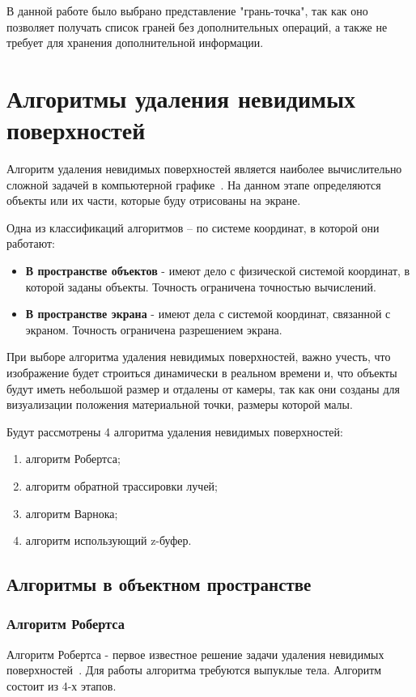 В данной работе было выбрано представление "грань-точка", так как оно позволяет получать список граней без дополнительных операций, а также не требует для хранения дополнительной информации.

\section{Алгоритмы удаления невидимых поверхностей}

Алгоритм удаления невидимых поверхностей является наиболее вычислительно сложной задачей в компьютерной графике~\cite{rodgers}. На данном этапе определяются объекты или их части, которые буду отрисованы на экране.

Одна из классификаций алгоритмов -- по системе координат, в которой они работают:
\begin{itemize}
	\item\textbf{В пространстве объектов} - имеют дело с физической системой координат, в которой заданы объекты. Точность ограничена точностью вычислений.
	\item\textbf{В пространстве экрана} - имеют дела с системой координат, связанной с экраном. Точность ограничена разрешением экрана.
\end{itemize}

При выборе алгоритма удаления невидимых поверхностей, важно учесть, что изображение будет строиться динамически в реальном времени и, что объекты будут иметь небольшой размер и отдалены от камеры, так как они созданы для визуализации положения материальной точки, размеры которой малы.

Будут рассмотрены 4 алгоритма удаления невидимых поверхностей:

\begin{enumerate}
	\item алгоритм Робертса;
	\item алгоритм обратной трассировки лучей;
	\item алгоритм Варнока;
	\item алгоритм использующий z-буфер.
\end{enumerate}

\subsection*{Алгоритмы в объектном пространстве}
\subsubsection{Алгоритм Робертса}
Алгоритм Робертса - первое известное решение задачи удаления невидимых поверхностей~\cite{rodgers}. Для работы алгоритма требуются выпуклые тела. Алгоритм состоит из 4-х этапов.

